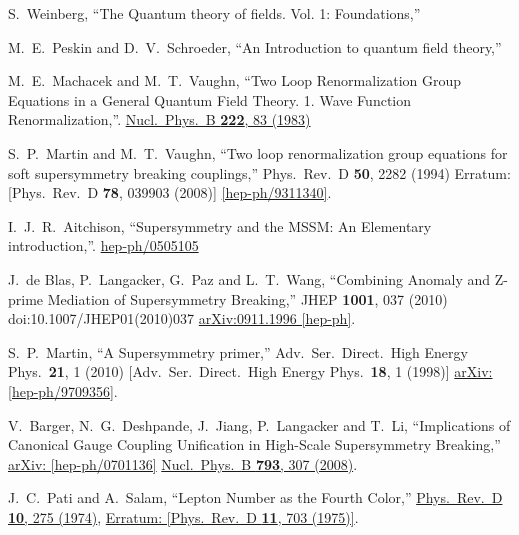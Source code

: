 \documentclass[11pt,prd,superscriptaddress,nofootinbib]{revtex4-1}
\numberwithin{equation}{section}
\begin{document}
\begin{thebibliography}{srt}

  S.~Weinberg,
  ``The Quantum theory of fields. Vol. 1: Foundations,''

  M.~E.~Peskin and D.~V.~Schroeder,
  ``An Introduction to quantum field theory,''

  M.~E.~Machacek and M.~T.~Vaughn,
  ``Two Loop Renormalization Group Equations in a General Quantum Field Theory. 1. Wave Function Renormalization,''.
\href{https://www.sciencedirect.com/science/article/pii/0550321383906107?via%3Dihub}{ Nucl.\ Phys.\ B {\bf 222}, 83 (1983)}  

  S.~P.~Martin and M.~T.~Vaughn,
  ``Two loop renormalization group equations for soft supersymmetry breaking couplings,''
  Phys.\ Rev.\ D {\bf 50}, 2282 (1994)
  Erratum: [Phys.\ Rev.\ D {\bf 78}, 039903 (2008)]
 \href{https://arxiv.org/abs/hep-ph/9311340}{[hep-ph/9311340]}.
  
  I.~J.~R.~Aitchison,
  ``Supersymmetry and the MSSM: An Elementary introduction,''.  
\href{https://arxiv.org/abs/hep-ph/0505105}{hep-ph/0505105}

  J.~de Blas, P.~Langacker, G.~Paz and L.~T.~Wang,
  ``Combining Anomaly and Z-prime Mediation of Supersymmetry Breaking,''
  JHEP {\bf 1001}, 037 (2010)
  doi:10.1007/JHEP01(2010)037
\href{https://arxiv.org/abs/0911.1996}{arXiv:0911.1996 [hep-ph]}.
   
  S.~P.~Martin,
  ``A Supersymmetry primer,''
  Adv.\ Ser.\ Direct.\ High Energy Phys.\  {\bf 21}, 1 (2010)
  [Adv.\ Ser.\ Direct.\ High Energy Phys.\  {\bf 18}, 1 (1998)]
\href{https://arxiv.org/abs/hep-ph/9709356}{arXiv:[hep-ph/9709356]}.

  V.~Barger, N.~G.~Deshpande, J.~Jiang, P.~Langacker and T.~Li,
  ``Implications of Canonical Gauge Coupling Unification in High-Scale Supersymmetry Breaking,''
\href{https://arxiv.org/abs/hep-ph/0701136}{arXiv: [hep-ph/0701136]} \href{https://www.sciencedirect.com/science/article/pii/S055032130700781X?}{Nucl.\ Phys.\ B {\bf 793}, 307 (2008)}.

  J.~C.~Pati and A.~Salam,
  ``Lepton Number as the Fourth Color,''
 \href{https://journals.aps.org/prd/abstract/10.1103/PhysRevD.10.275}{Phys.\ Rev.\ D {\bf 10}, 275 (1974)}, \href{https://journals.aps.org/prd/abstract/10.1103/PhysRevD.11.703.2}{ Erratum: [Phys.\ Rev.\ D {\bf 11}, 703 (1975)]}.
 

\end{thebibliography}
\end{document}
